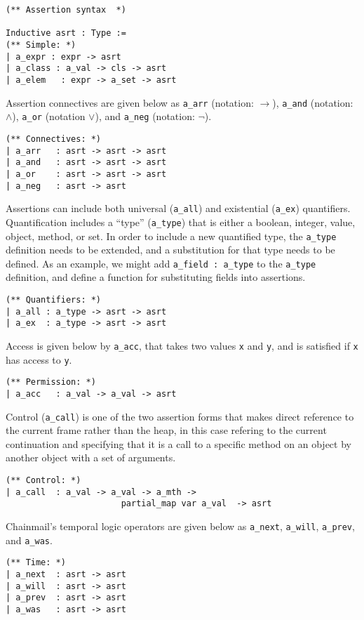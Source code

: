 \documentclass[12pt]{article}
\begin{document}
\begin{verbatim}
(** Assertion syntax  *)

Inductive asrt : Type :=
(** Simple: *)
| a_expr : expr -> asrt
| a_class : a_val -> cls -> asrt
| a_elem   : expr -> a_set -> asrt
\end{verbatim}
Assertion connectives are given below as \verb|a_arr| (notation: $\longrightarrow$), \verb|a_and| (notation: $\wedge$), \verb|a_or| (notation $\vee$), and \verb|a_neg| (notation: $\neg$).
\begin{verbatim}
(** Connectives: *)
| a_arr   : asrt -> asrt -> asrt
| a_and   : asrt -> asrt -> asrt
| a_or    : asrt -> asrt -> asrt
| a_neg   : asrt -> asrt
\end{verbatim}
Assertions can include both universal (\verb|a_all|) and existential (\verb|a_ex|) quantifiers. Quantification includes a ``type'' (\verb|a_type|) that is either a boolean, integer, value, object, method, or set. In order to include a new quantified type, the \verb|a_type| definition needs to be extended, and a substitution for that type needs to be defined. As an example, we might add \verb|a_field : a_type| to the \verb|a_type| definition, and define a function for substituting fields into assertions.
\begin{verbatim}
(** Quantifiers: *)
| a_all : a_type -> asrt -> asrt
| a_ex  : a_type -> asrt -> asrt
\end{verbatim}
Access is given below by \verb|a_acc|, that takes two values \verb|x| and \verb|y|, and is satisfied if \verb|x| has access to \verb|y|.
\begin{verbatim}
(** Permission: *)
| a_acc   : a_val -> a_val -> asrt
\end{verbatim}
Control (\verb|a_call|) is one of the two assertion forms that makes direct reference to the current frame rather than the heap, in this case refering to the current continuation and 
specifying that it is a call to a specific method on an object by another object with a set of arguments.
\begin{verbatim}
(** Control: *)
| a_call  : a_val -> a_val -> a_mth -> 
                       partial_map var a_val  -> asrt
\end{verbatim}
Chainmail's temporal logic operators are given below as \verb|a_next|, \verb|a_will|, \verb|a_prev|, and \verb|a_was|.
\begin{verbatim}
(** Time: *)
| a_next  : asrt -> asrt
| a_will  : asrt -> asrt
| a_prev  : asrt -> asrt
| a_was   : asrt -> asrt
\end{verbatim}
\end{document}
